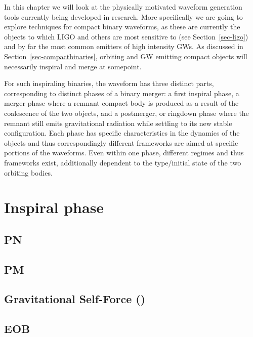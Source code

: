 \documentclass[
  letterpaper,
  DIV=11,
  numbers=noendperiod,
  oneside]{scrreprt}
\begin{document}
In this chapter we will look at the physically motivated waveform
generation tools currently being developed in research. More
specifically we are going to explore techniques for compact binary
waveforms, as these are currently the objects to which {LIGO} and others
are most sensitive to (see Section~\ref{sec-ligo}) and by far the most
common emitters of high intensity {GW}s. As discussed in
Section~\ref{sec-compactbinaries}, orbiting and {GW} emitting compact
objects will necessarily inspiral and merge at somepoint.

For such inspiraling binaries, the waveform has three distinct parts,
corresponding to distinct phases of a binary merger: a first inspiral
phase, a merger phase where a remnant compact body is produced as a
result of the coalescence of the two objects, and a postmerger, or
ringdown phase where the remnant still emits gravitational radiation
while settling to its new stable configuration. Each phase has specific
characteristics in the dynamics of the objects and thus correspondingly
different frameworks are aimed at specific portions of the waveforms.
Even within one phase, different regimes and thus frameworks exist,
additionally dependent to the type/initial state of the two orbiting
bodies.


\hypertarget{inspiral-phase}{%
\chapter{Inspiral phase}\label{inspiral-phase}}

\hypertarget{section-1}{%
\section{\texorpdfstring{{PN}}{PN}}\label{section-1}}

\hypertarget{section-2}{%
\section{\texorpdfstring{{PM}}{PM}}\label{section-2}}

\hypertarget{section-3}{%
\section{Gravitational Self-Force ()}\label{section-3}}

\hypertarget{section-4}{%
\section{\texorpdfstring{{EOB}}{EOB}}\label{section-4}}
\end{document}
